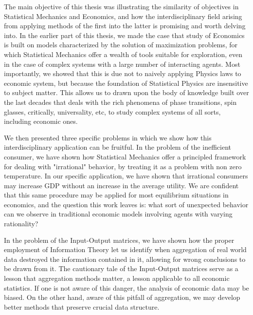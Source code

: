The main objective of this thesis was illustrating the similarity of objectives in Statistical Mechanics and Economics, and how the interdisciplinary field arising from applying methods of the first into the latter is promising and worth delving into. In the earlier part of this thesis, we made the case that study of Economics is built on models characterized by the solution of maximization problems, for which Statistical Mechanics offer a wealth of tools suitable for exploration, even in the case of complex systems with a large number of interacting agents. Most importantly, we showed that this is due not to naively applying Physics laws to economic system, but because the foundation of Statistical Physics are insensitive to subject matter. This allows us to drawn upon the body of knowledge built over the last decades that deals with the rich phenomena of phase transitions, spin glasses, critically, universality, etc, to study complex systems of all sorts, including economic ones.

We then presented three specific problems in which we show how this interdisciplinary application can be fruitful. In the problem of the inefficient consumer, we have shown how Statistical Mechanics offer a principled framework for dealing with "irrational" behavior, by treating it as a problem with non zero temperature. In our specific application, we have shown that irrational consumers may increase GDP without an increase in the average utility. We are confident that this same procedure may be applied for most equilibrium situations in economics, and the question this work leaves is: what sort of unexpected behavior can we observe in traditional economic models involving agents with varying rationality?

In the problem of the Input-Output matrices, we have shown how the proper employment of Information Theory let us identify when aggregation of real world data destroyed the information contained in it, allowing for wrong conclusions to be drawn from it. The cautionary tale of the Input-Output matrices serve as a lesson that aggregation methods matter, a lesson applicable to all economic statistics. If one is not aware of this danger, the analysis of economic data may be biased. On the other hand, aware of this pitfall of aggregation, we may develop better methods that preserve crucial data structure.

